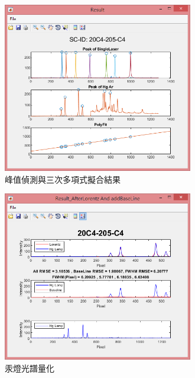 \begin{figure}[H] %
	\centering %
	\vspace{0.8cm}
	\includegraphics[width=0.74\textwidth]{figures/Result/Result_2021-05-10-16-29-08.jpg} %
	\caption{峰值偵測與三次多項式擬合結果} %
	\label{峰值偵測與三次多項式擬合結果} %
\end{figure}
\begin{figure}[H] %
	\centering %
	\vspace{0.8cm}
	\includegraphics[width=0.74\textwidth]{figures/Result/Result_2021-05-10-16-24-49.jpg} %
	\caption{汞燈光譜量化} %
	\label{汞燈光譜量化} %
\end{figure}
